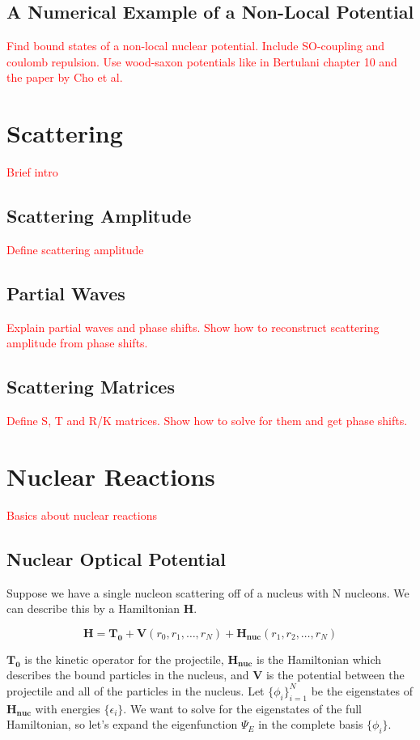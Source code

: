 \documentclass[12pt,letterpaper]{article}
\numberwithin{equation}{section}
\newcommand{\beq}{\begin{equation}}
\newcommand{\eeq}{\end{equation}}
\begin{document}
\subsection{A Numerical Example of a Non-Local Potential}
\textcolor{red}{Find bound states of a non-local nuclear potential. Include SO-coupling and coulomb repulsion. Use wood-saxon potentials like in Bertulani chapter 10 and the paper by Cho et al.} 

\section{Scattering}
\textcolor{red}{Brief intro}

\subsection{Scattering Amplitude}
\textcolor{red}{Define scattering amplitude}

\subsection{Partial Waves}
\textcolor{red}{Explain partial waves and phase shifts. Show how to reconstruct scattering amplitude from phase shifts.}

\subsection{Scattering Matrices}
\textcolor{red}{Define S, T and R/K matrices. Show how to solve for them and get phase shifts.}

\section{Nuclear Reactions}
\textcolor{red}{Basics about nuclear reactions}

\subsection{Nuclear Optical Potential}
Suppose we have a single nucleon scattering off of a nucleus with N nucleons. We can describe this by a Hamiltonian $\boldsymbol{H}$.

\beq
\boldsymbol{H} = \boldsymbol{T_0} + \boldsymbol{V}(r_0, r_1, \dots, r_N) + \boldsymbol{H_{nuc}}(r_1, r_2, \dots, r_N)
\eeq

$\boldsymbol{T_0}$ is the kinetic operator for the projectile, $\boldsymbol{H_{nuc}}$ is the Hamiltonian which describes the bound particles in the nucleus, and $\boldsymbol{V}$ is the potential between the projectile and all of the particles in the nucleus. Let $\{\phi_i\}_{i=1}^N$ be the eigenstates of $\boldsymbol{H_{nuc}}$ with energies $\{\epsilon_i\}$. We want to solve for the eigenstates of the full Hamiltonian, so let's expand the eigenfunction $\Psi_E$ in the complete basis $\{\phi_i\}$.
\end{document}

